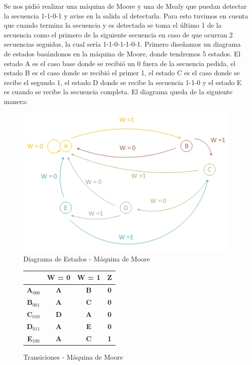 \documentclass[10pt,a4paper]{article}
\begin{document}
Se nos pidi\'o realizar una m\'aquina de Moore y una de Mealy que puedan detectar la secuencia 1-1-0-1 y avise en la salida al detectarla. Para esto tuvimos en cuenta que cuando termina la secuencia y es detectada se toma el \'ultimo 1 de la secuencia como el primero de la siguiente secuencia en caso de que ocurran 2 secuencias seguidas, la cual ser\'ia 1-1-0-1-1-0-1. Primero diseñamos un diagrama de estados basándonos en la m\'aquina de Moore, donde tendremos 5 estados. El estado A es el caso base donde se recibió un 0 fuera de la secuencia pedida, el estado B es el caso donde se recibió el primer 1, el estado C es el caso donde se recibe el segundo 1, el estado D donde se recibe la secuencia 1-1-0 y el estado E es cuando se recibe la secuencia completa. 
El diagrama queda de la siguiente manera:

\begin{figure}[hbtp]
	\centering
		\includegraphics[scale=1]{diagestmoore.jpg}
	\caption{Diagrama de Estados - Máquina de Moore}
\end{figure}



\begin{figure}[H]
\begin{center}
\begin{tabular}{c|c|c|c|}
\cline{2-4}
\textbf{} & \textbf{W = 0} & \textbf{W = 1} & \textbf{Z} \\ \hline
\multicolumn{1}{|c|}{\textbf{A$_{000}$}} & \textbf{A} & \textbf{B} & \textbf{0} \\ \hline
\multicolumn{1}{|c|}{\textbf{B$_{001}$}} & \textbf{A} & \textbf{C} & \textbf{0} \\ \hline
\multicolumn{1}{|c|}{\textbf{C$_{010}$}} & \textbf{D} & \textbf{A} & \textbf{0} \\ \hline
\multicolumn{1}{|c|}{\textbf{D$_{011}$}} & \textbf{A} & \textbf{E} & \textbf{0} \\ \hline
\multicolumn{1}{|c|}{\textbf{E$_{100}$}} & \textbf{A} & \textbf{C} & \textbf{1} \\ \hline
\end{tabular}
\caption{Transiciones - Máquina de Moore} 
\label{2_fig1}
\end{center}
\end{figure}
	
\end{document}

